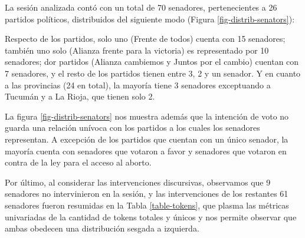 La sesión analizada contó con un total de 70 senadores,
pertenecientes a 26 partidos políticos, distribuidos del
siguiente modo (Figura \ref{fig-distrib-senators}):


Respecto de los partidos, solo uno (Frente de todos) cuenta con 15
senadores; también uno solo (Alianza frente para la victoria) es
representado por 10 senadores; dor partidos (Alianza cambiemos y
Juntos por el cambio) cuentan con 7 senadores, y el resto de los
partidos tienen entre 3, 2 y un senador. Y en cuanto a las provincias
(24 en total), la mayoría tiene 3 senadores exceptuando a Tucumán y
a La Rioja, que tienen solo 2.

La figura \ref{fig-distrib-senators} nos muestra además que la intención
de voto no guarda una relación unívoca con los partidos a los cuales los
senadores representan. A excepción de los partidos que cuentan con un único
senador, la mayoría cuenta con senadores que votaron a favor y senadores
que votaron en contra de la ley para el acceso al aborto.


Por último, al considerar las intervenciones discursivas, observamos que
9 senadores no intervinieron en la sesión, y las intervenciones de los
restantes 61 senadores fueron resumidas en la Tabla \ref{table-tokens}, que plasma
las métricas univariadas de la cantidad de tokens totales y únicos y nos
permite observar que ambas obedecen una distribución sesgada a izquierda.


